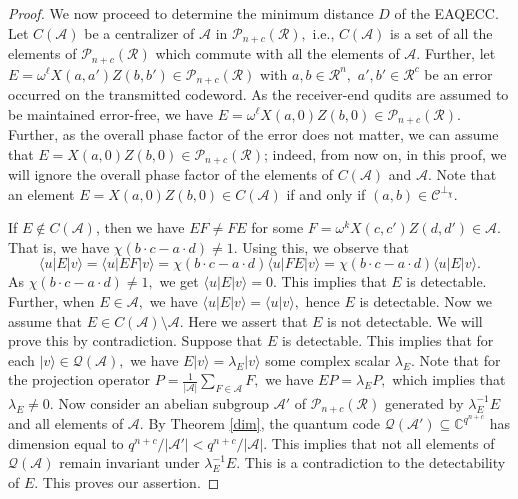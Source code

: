 \documentclass{article}
\theoremstyle{remark}
\theoremstyle{definition}
\numberwithin{equation}{section}
\begin{document}
\begin{proof}
We now proceed to determine the minimum distance $D$ of the EAQECC. Let $C(\mathcal{A})$  be a centralizer of $\mathcal{A}$ in $\mathcal{P}_{n+c}(\mathcal{R}),$ i.e., $C(\mathcal{A})$ is a set of all the elements of  $\mathcal{P}_{n+c}(\mathcal{R})$ which commute with all the elements of $\mathcal{A}.$ Further, let $E=\omega^{\ell} X(a,a')Z(b,b') \in \mathcal{P}_{n+c}(\mathcal{R})$ with $a,b \in \mathcal{R}^{n},$ $a',b' \in \mathcal{R}^{c}$ be an error occurred on the transmitted codeword. As the receiver-end qudits are assumed to be maintained error-free, we have  $E=\omega^{\ell} X(a,0)Z(b,0) \in \mathcal{P}_{n+c}(\mathcal{R}).$ Further, as the overall phase factor of the error does not matter, we can assume that $E= X(a,0)Z(b,0) \in \mathcal{P}_{n+c}(\mathcal{R})$; indeed, from now on, in this proof, we will ignore the overall phase factor of the elements of $C(\mathcal{A})$ and $\mathcal{A}.$ Note that an element $E= X(a,0)Z(b,0) \in C(\mathcal{A})$  if and only if $(a,b) \in \mathcal{C}^{\perp_\chi}.$

If $E \not\in C(\mathcal{A})$, then we have $EF\neq FE$ for some $F=\omega^{k} X(c,c')Z(d,d') \in \mathcal{A}.$ That is, we have $\chi(b\cdot c-a\cdot d)\neq 1.$ Using this, we observe that $$\langle u | E| v \rangle=\langle u | EF| v \rangle=\chi(b\cdot c-a\cdot d) \langle u | FE| v \rangle=\chi(b\cdot c-a\cdot d) \langle u | E| v \rangle.$$
As $\chi(b\cdot c-a\cdot d)\neq1,$ we get $\langle u | E| v \rangle=0.$ This implies that $E$ is detectable. 
Further, when $E \in\mathcal{A},$ we have $\langle u | E| v \rangle=\langle u |  v \rangle,$ hence $E$ is detectable. Now we assume that $E \in C(\mathcal{A}) \setminus \mathcal{A}$. Here we assert that $E$ is not detectable. We will prove this by contradiction. Suppose that $E$ is detectable. This implies that for each $|v \rangle \in \mathcal{Q}(\mathcal{A}),$ we have $E|v \rangle =\lambda_E |v \rangle$ some complex scalar $\lambda_E.$ Note that for the projection operator $P= \frac{1}{|\mathcal{A}|}\sum\limits_{F \in \mathcal{A}}^{} F,$  we have $EP=\lambda_EP,$ which implies that $\lambda_E \neq 0.$ Now consider an abelian subgroup $\mathcal{A}'$ of $\mathcal{P}_{n+c}(\mathcal{R})$ generated by $\lambda_E^{-1}E$ and all elements of $\mathcal{A}.$ By Theorem \ref{dim}, the quantum code $\mathcal{Q}(\mathcal{A}') \subseteq \mathbb{C}^{q^{n+c}}$ has dimension equal to $q^{n+c}/|\mathcal{A}'|<q^{n+c}/|\mathcal{A}|.$ This implies that not all elements of $\mathcal{Q}(\mathcal{A})$ remain invariant under $\lambda_E^{-1}E.$ This is a contradiction to the detectability of $E.$ This proves our assertion.


\end{proof}
\end{document}
